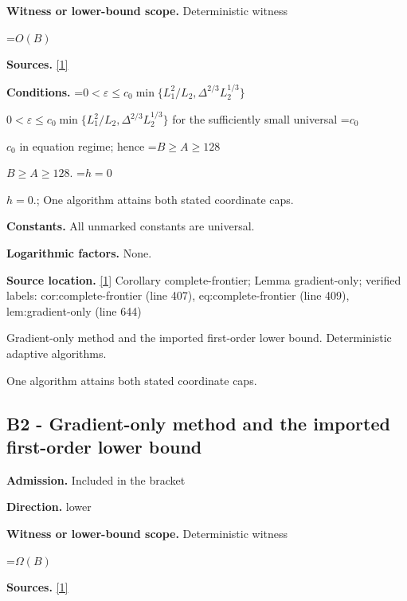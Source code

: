 \documentclass[10pt,a4paper]{article}
\newcommand{\AtlasMath}[1]{\par\begingroup\centering\setbox0=\hbox{$\displaystyle #1$}\ifdim\wd0>1.4\linewidth\typeout{ATLAS WIDE FORMULA: \the\wd0}\fi\ifdim\wd0>\linewidth\resizebox{\linewidth}{!}{\box0}\else\box0\fi\par\endgroup}
\newcommand{\AtlasInlineMath}[1]{\begingroup\setbox0=\hbox{$#1$}\ifdim\wd0>.4\linewidth\endgroup\AtlasMath{#1}\else\endgroup$#1$\fi}
\begin{document}
\textbf{Witness or lower-bound scope.} Deterministic witness



\AtlasMath{O\!\left(B\right)}


\textbf{Sources.} \href{https://github.com/WU-Wendao/Colombo/blob/main/colombo_sensorium/Complexity_altas/data/sources/colombo/0904/manuscript.pdf}{[1]}



\textbf{Conditions.} \AtlasInlineMath{0<\varepsilon\le c_0\min\{L_1^2/L_2,\Delta^{2/3}L_2^{1/3}\}} for the sufficiently small universal \AtlasInlineMath{c_0} in equation regime; hence \AtlasInlineMath{B\ge A\ge128}. \AtlasInlineMath{h=0}.; One algorithm attains both stated coordinate caps.



\textbf{Constants.} All unmarked constants are universal.



\textbf{Logarithmic factors.} None.



\textbf{Source location.} \href{https://github.com/WU-Wendao/Colombo/blob/main/colombo_sensorium/Complexity_altas/data/sources/colombo/0904/manuscript.pdf}{[1]} Corollary complete-frontier; Lemma gradient-only; verified labels: cor:complete-frontier (line 407), eq:complete-frontier (line 409), lem:gradient-only (line 644)



Gradient-only method and the imported first-order lower bound. Deterministic adaptive algorithms.



One algorithm attains both stated coordinate caps.



\subsection{B2 - Gradient-only method and the imported first-order lower bound}


\textbf{Admission.} Included in the bracket



\textbf{Direction.} lower



\textbf{Witness or lower-bound scope.} Deterministic witness



\AtlasMath{\Omega\!\left(B\right)}


\textbf{Sources.} \href{https://github.com/WU-Wendao/Colombo/blob/main/colombo_sensorium/Complexity_altas/data/sources/colombo/0904/manuscript.pdf}{[1]}
\end{document}
